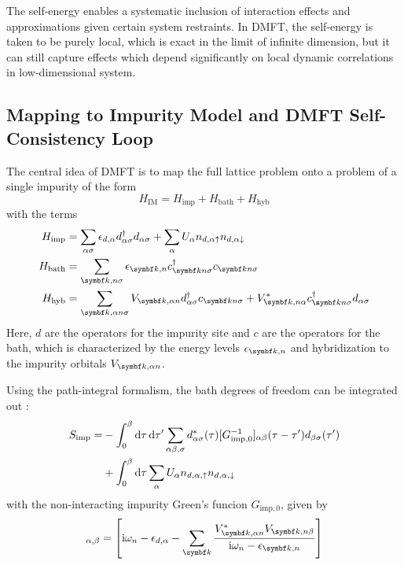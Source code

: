 \documentclass[../main.tex]{subfiles}
\begin{document}
The self-energy enables a systematic inclusion of interaction effects and approximations given certain system restraints.
In DMFT, the self-energy is taken to be purely local, which is exact in the limit of infinite dimension, but it can still capture effects which depend significantly on local dynamic correlations in low-dimensional system.

\subsection*{Mapping to Impurity Model and DMFT Self-Consistency Loop}

The central idea of DMFT is to map the full lattice problem onto a problem of a single impurity of the form
\begin{equation}
	H_{\mathrm{IM}} = H_{\mathrm{imp}} + H_{\mathrm{bath}} + H_{\mathrm{hyb}}
\end{equation}
with the terms
\begin{align}
	H_{\mathrm{imp}} &= \sum_{\alpha \sigma} \epsilon_{d, \alpha} d_{\alpha \sigma}^{\dagger} d_{\alpha \sigma} + \sum_{\alpha} U_{\alpha} n_{d, \alpha \uparrow} n_{d, \alpha \downarrow} \\
	H_{\mathrm{bath}} &= \sum_{\vb{k}, n \sigma} \epsilon_{\vb{k}, n} c_{\vb{k} n \sigma}^{\dagger} c_{\vb{k} n \sigma}  \\
	H_{\mathrm{hyb}} &= \sum_{\vb{k}, \alpha n \sigma} V_{\vb{k}, \alpha n} d_{\alpha \sigma}^{\dagger} c_{\vb{k} n \sigma} + V_{\vb{k}, n \alpha}^* c_{\vb{k} n \sigma}^{\dagger} d_{\alpha \sigma}
\end{align}
Here, \(d\) are the operators for the impurity site and \(c\) are the operators for the bath, which is characterized by the energy levels \(\epsilon_{\vb{k}, n}\) and hybridization to the impurity orbitals \(V_{\vb{k}, \alpha n}\).

Using the path-integral formalism, the bath degrees of freedom can be integrated out \cite{georgesDynamicalMeanfieldTheory1996}:
\begin{align}
	S_{\mathrm{imp}} = &-\int_{0}^{\beta} \odif{\tau} \odif{\tau^{\prime}} \sum_{\alpha \beta, \sigma} d^*_{\alpha \sigma} (\tau) [G_{\mathrm{imp}, 0}^{-1}]_{\alpha \beta} (\tau - \tau^{\prime}) d_{\beta \sigma} (\tau^{\prime}) \\
	&+ \int_{0}^{\beta} \odif{\tau} \sum_{\alpha} U_{\alpha} n_{d, \alpha, \uparrow} n_{d, \alpha, \downarrow}
\end{align}
with the non-interacting impurity Green's funcion \(G_{\mathrm{imp}, 0}\), given by
\begin{equation}
	[G_{\mathrm{imp}, 0}]_{\alpha, \beta} = \left[\iu \omega_n - \epsilon_{d, \alpha} - \sum_{\vb{k}} \frac{V_{\vb{k}, \alpha n}^* V_{\vb{k}, n \beta}}{\iu \omega_n - \epsilon_{\vb{k}, n}} \right]
\end{equation}
\end{document}
